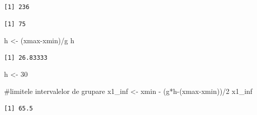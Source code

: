 \documentclass[
  11pt,
  b5paper,
  nottoc]{book}
\newenvironment{Shaded}{\begin{snugshade}}{\end{snugshade}}
\newcommand{\CommentTok}[1]{\textcolor[rgb]{0.37,0.37,0.37}{#1}}
\newcommand{\DecValTok}[1]{\textcolor[rgb]{0.68,0.00,0.00}{#1}}
\newcommand{\FunctionTok}[1]{\textcolor[rgb]{0.28,0.35,0.67}{#1}}
\newcommand{\NormalTok}[1]{\textcolor[rgb]{0.00,0.23,0.31}{#1}}
\newcommand{\OtherTok}[1]{\textcolor[rgb]{0.00,0.23,0.31}{#1}}
\newcommand{\SpecialCharTok}[1]{\textcolor[rgb]{0.37,0.37,0.37}{#1}}
\begin{document}
\begin{verbatim}
[1] 236
\end{verbatim}

\begin{Shaded}
\end{Shaded}

\begin{verbatim}
[1] 75
\end{verbatim}

\begin{Shaded}
\begin{Highlighting}[]
\NormalTok{h }\OtherTok{\textless{}{-}}\NormalTok{ (xmax}\SpecialCharTok{{-}}\NormalTok{xmin)}\SpecialCharTok{/}\NormalTok{g}
\NormalTok{h}
\end{Highlighting}
\end{Shaded}

\begin{verbatim}
[1] 26.83333
\end{verbatim}

\begin{Shaded}
\begin{Highlighting}[]
\NormalTok{h }\OtherTok{\textless{}{-}} \DecValTok{30}

\CommentTok{\#limitele intervalelor de grupare}
\NormalTok{x1\_inf }\OtherTok{\textless{}{-}}\NormalTok{ xmin }\SpecialCharTok{{-}}\NormalTok{ (g}\SpecialCharTok{*}\NormalTok{h}\SpecialCharTok{{-}}\NormalTok{(xmax}\SpecialCharTok{{-}}\NormalTok{xmin))}\SpecialCharTok{/}\DecValTok{2}
\NormalTok{x1\_inf }
\end{Highlighting}
\end{Shaded}

\begin{verbatim}
[1] 65.5
\end{verbatim}
\end{document}
